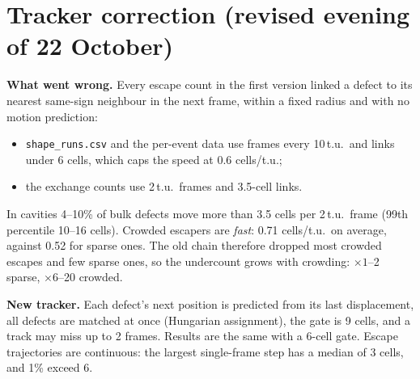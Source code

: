 \documentclass[11pt,a4paper]{article}
\newcommand{\hyp}{\textbf{\textcolor{orange!80!black}{[hypothesis]}}}
\newcommand{\supp}{\textbf{\textcolor{green!50!black}{[supported]}}}
\newcommand{\out}{\textbf{\textcolor{red!70!black}{[ruled out]}}}
\begin{document}
\begin{abstract}
\begin{itemize}
\item \textbf{Kinetics vs steady state.} Crowding blocks exits but not entries, and it restores a stationary layer in elongated cavities. It changes the steady bulk charge per length by only about 35\%. The channels behave in the same way.
\item \textbf{Channels: no topological current.} The mid-line ``current'' of mixed-winding channels was a tracking artefact; an exact topological check gives zero (Sec.~\ref{sec:tracker}).
\item \textbf{Fig.~1(c) of the PRL.} The charge does add up. The ``vacancies'' at large $R$ are defects 4--12 cells from the wall (a diffuse layer) that neither panel counts.
\end{itemize}

Each claim below is tagged \supp, \hyp\ or \out.
\end{abstract}

\tableofcontents
\bigskip

\section{Tracker correction (revised evening of 22 October)}\label{sec:tracker}
\textbf{What went wrong.} Every escape count in the first version linked a defect to its nearest same-sign neighbour in the next frame, within a fixed radius and with no motion prediction:
\begin{itemize}
\item \texttt{shape\_runs.csv} and the per-event data use frames every 10\,t.u.\ and links under 6 cells, which caps the speed at 0.6 cells/t.u.;
\item the exchange counts use 2\,t.u.\ frames and 3.5-cell links.
\end{itemize}
In cavities 4--10\% of bulk defects move more than 3.5 cells per 2\,t.u.\ frame (99th percentile 10--16 cells). Crowded escapers are \emph{fast}: 0.71 cells/t.u.\ on average, against 0.52 for sparse ones. The old chain therefore dropped most crowded escapes and few sparse ones, so the undercount grows with crowding: $\times1$--2 sparse, $\times6$--20 crowded.

\textbf{New tracker.} Each defect's next position is predicted from its last displacement, all defects are matched at once (Hungarian assignment), the gate is 9 cells, and a track may miss up to 2 frames. Results are the same with a 6-cell gate. Escape trajectories are continuous: the largest single-frame step has a median of 3 cells, and 1\% exceed 6.
\end{document}
